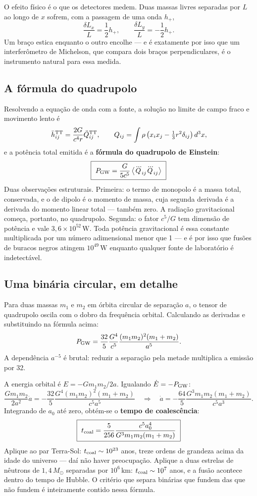 \documentclass[11pt,a4paper]{article}
\begin{document}
O efeito físico é o que os detectores medem. Duas massas livres separadas por $L$ ao longo de $x$ sofrem, com a passagem de uma onda $h_+$,
\[
\frac{\delta L_x}{L}=\frac{1}{2}h_+,
\qquad
\frac{\delta L_y}{L}=-\frac{1}{2}h_+.
\]
Um braço estica enquanto o outro encolhe --- e é exatamente por isso que um interferômetro de Michelson, que compara dois braços perpendiculares, é o instrumento natural para essa medida.

\subsection*{A fórmula do quadrupolo}

Resolvendo a equação de onda com a fonte, a solução no limite de campo fraco e movimento lento é
\[
\bar{h}_{ij}^{\rm TT}=\frac{2G}{c^{4}r}\ddot{Q}_{ij}^{\rm TT},
\qquad
Q_{ij}=\int\rho\left(x_ix_j-\tfrac{1}{3}r^{2}\delta_{ij}\right)d^{3}x,
\]
e a potência total emitida é a \textbf{fórmula do quadrupolo de Einstein}:
\[
\boxed{\ P_{\rm GW}=\frac{G}{5c^{5}}\left\langle\dddot{Q}_{ij}\dddot{Q}_{ij}\right\rangle\ }
\]
Duas observações estruturais. Primeira: o termo de monopolo é a massa total, conservada, e o de dipolo é o momento de massa, cuja segunda derivada é a derivada do momento linear total --- também zero. A radiação gravitacional começa, portanto, no quadrupolo. Segunda: o fator $c^{5}/G$ tem dimensão de potência e vale $3{,}6\times10^{52}\,\mathrm{W}$. Toda potência gravitacional é essa constante multiplicada por um número adimensional menor que 1 --- e é por isso que fusões de buracos negros atingem $10^{49}\,\mathrm{W}$ enquanto qualquer fonte de laboratório é indetectável.

\subsection*{Uma binária circular, em detalhe}

Para duas massas $m_1$ e $m_2$ em órbita circular de separação $a$, o tensor de quadrupolo oscila com o dobro da frequência orbital. Calculando as derivadas e substituindo na fórmula acima:
\[
P_{\rm GW}=\frac{32}{5}\frac{G^{4}}{c^{5}}\frac{(m_1m_2)^{2}(m_1+m_2)}{a^{5}}.
\]
A dependência $a^{-5}$ é brutal: reduzir a separação pela metade multiplica a emissão por 32.

A energia orbital é $E=-Gm_1m_2/2a$. Igualando $\dot{E}=-P_{\rm GW}$:
\[
\frac{Gm_1m_2}{2a^{2}}\dot{a}=-\frac{32}{5}\frac{G^{4}(m_1m_2)^{2}(m_1+m_2)}{c^{5}a^{5}}
\quad\Longrightarrow\quad
\dot{a}=-\frac{64}{5}\frac{G^{3}m_1m_2(m_1+m_2)}{c^{5}a^{3}}.
\]
Integrando de $a_0$ até zero, obtém-se o \textbf{tempo de coalescência}:
\[
\boxed{\ t_{\rm coal}=\frac{5}{256}\frac{c^{5}a_0^{4}}{G^{3}m_1m_2(m_1+m_2)}\ }
\]
Aplique ao par Terra-Sol: $t_{\rm coal}\sim10^{23}$ anos, treze ordens de grandeza acima da idade do universo --- daí não haver preocupação. Aplique a duas estrelas de nêutrons de $1{,}4\,M_\odot$ separadas por $10^{6}\,\mathrm{km}$: $t_{\rm coal}\sim10^{7}$ anos, e a fusão acontece dentro do tempo de Hubble. O critério que separa binárias que fundem das que não fundem é inteiramente contido nessa fórmula.
\end{document}
